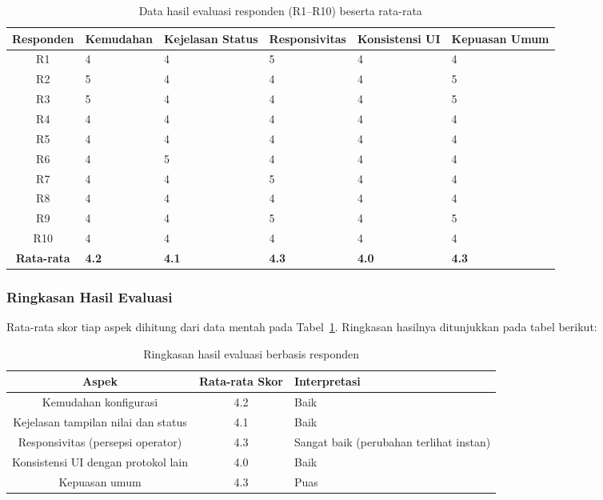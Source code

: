 \begin{table}[H]
\centering
\begin{tabular}{|c|p{2.2cm}|p{2.5cm}|p{2.5cm}|p{2.2cm}|p{2cm}|}
\hline
\textbf{Responden} & \textbf{Kemudahan} & \textbf{Kejelasan Status} & \textbf{Responsivitas} & \textbf{Konsistensi UI} & \textbf{Kepuasan Umum} \\ \hline
R1 & 4 & 4 & 5 & 4 & 4 \\ \hline
R2 & 5 & 4 & 4 & 4 & 5 \\ \hline
R3 & 5 & 4 & 4 & 4 & 5 \\ \hline
R4 & 4 & 4 & 4 & 4 & 4 \\ \hline
R5 & 4 & 4 & 4 & 4 & 4 \\ \hline
R6 & 4 & 5 & 4 & 4 & 4 \\ \hline
R7 & 4 & 4 & 5 & 4 & 4 \\ \hline
R8 & 4 & 4 & 4 & 4 & 4 \\ \hline
R9 & 4 & 4 & 5 & 4 & 5 \\ \hline
R10 & 4 & 4 & 4 & 4 & 4 \\ \hline
\rowcolor{gray!20}
\textbf{Rata-rata} & \textbf{4.2} & \textbf{4.1} & \textbf{4.3} & \textbf{4.0} & \textbf{4.3} \\ \hline
\end{tabular}
\caption{Data hasil evaluasi responden (R1--R10) beserta rata-rata}
\label{tab:raw-respondent}
\end{table}

\subsubsection{Ringkasan Hasil Evaluasi}
Rata-rata skor tiap aspek dihitung dari data mentah pada Tabel~\ref{tab:raw-respondent}. Ringkasan hasilnya ditunjukkan pada tabel berikut:

\begin{table}[H]
    \centering
    \begin{tabular}{|c|c|p{3.5cm}|}
        \hline
        \textbf{Aspek} & \textbf{Rata-rata Skor} & \textbf{Interpretasi} \\ \hline
        Kemudahan konfigurasi & 4.2 & Baik \\ \hline
        Kejelasan tampilan nilai dan status & 4.1 & Baik \\ \hline
        Responsivitas (persepsi operator) & 4.3 & Sangat baik (perubahan terlihat instan) \\ \hline
        Konsistensi UI dengan protokol lain & 4.0 & Baik \\ \hline
        Kepuasan umum & 4.3 & Puas \\ \hline
    \end{tabular}
    \caption{Ringkasan hasil evaluasi berbasis responden}
    \label{tab:usability}
\end{table}

